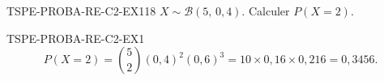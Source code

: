 

\begin{exercice}{TSPE-PROBA-RE-C2-EX1}{1}{8}
$X \sim \mathcal{B}(5,\,0{,}4)$. Calculer $P(X=2)$.
\end{exercice}


\begin{corrige}{TSPE-PROBA-RE-C2-EX1}
\[
  P(X=2) = \binom{5}{2}(0{,}4)^2(0{,}6)^3 = 10\times0{,}16\times0{,}216 = 0{,}3456.
\]
\end{corrige}
